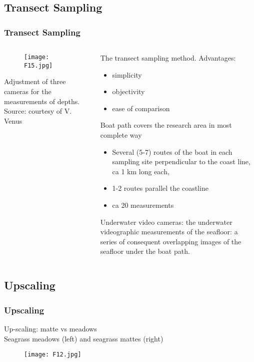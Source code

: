 \documentclass[pdflatex,compress,8pt,
	xcolor={dvipsnames,dvipsnames,svgnames,x11names,table},
	hyperref={colorlinks = true,breaklinks = true, urlcolor = NavyBlue, breaklinks = true}]{beamer}
\begin{document}
\subsection{Transect Sampling}
\begin{frame}\frametitle{Transect Sampling}
\begin{minipage}[0.4\textheight]{\textwidth}
\begin{columns}[T]
\begin{column}{0.5\textwidth}
\begin{figure}[H]
	\centering
		\texttt{[image: F15.jpg]}
\end{figure}
\footnotesize{Adjustment of three cameras for the measurements of depths. Source: courtesy of V. Venus}
\end{column}
\begin{column}{0.5\textwidth}
The transect sampling method.
Advantages: 
\begin{itemize}
	\item simplicity
	\item objectivity 
	\item ease of comparison
\end{itemize}
Boat path covers the research area in most complete way
\begin{itemize}
	\item Several (5-7) routes of the boat in each sampling site perpendicular to the coast line, ca 1 km long each,
	\item 1-2 routes parallel the coastline
	\item ca 20 measurements
\end{itemize}
Underwater video cameras: the underwater videographic measurements of the seafloor:
a series of consequent overlapping images of the seafloor under the boat path.
\end{column}
\end{columns}
\end{minipage}
\end{frame}

\subsection{Upscaling}
\begin{frame}\frametitle{Upscaling}
Up-scaling: matte vs meadows\\
Seagrass meadows (left) and seagrass mattes (right)
\begin{figure}[H]
	\centering
		\texttt{[image: F12.jpg]}
\end{figure}
\end{frame}
\end{document}
